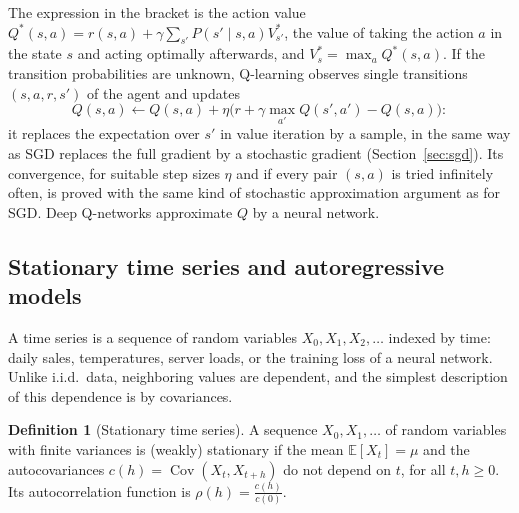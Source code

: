 \documentclass[11pt]{article}
\newcommand{\E}{\mathbb{E}}
\DeclareMathOperator{\Cov}{Cov}
\theoremstyle{definition}
\newtheorem{definition}{Definition}[section]
\theoremstyle{plain}
\theoremstyle{remark}
\begin{document}
The expression in the bracket is the action value $Q^*(s, a) = r(s, a) + \gamma\sum_{s'}P(s' \mid s, a)V^*_{s'}$, the value of taking the action $a$ in the state $s$ and acting optimally afterwards, and $V^*_s = \max_a Q^*(s, a)$. If the transition probabilities are unknown, Q-learning observes single transitions $(s, a, r, s')$ of the agent and updates
\[Q(s, a) \leftarrow Q(s, a) + \eta\big(r + \gamma\max_{a'}Q(s', a') - Q(s, a)\big):\]
it replaces the expectation over $s'$ in value iteration by a sample, in the same way as SGD replaces the full gradient by a stochastic gradient (Section~\ref{sec:sgd}). Its convergence, for suitable step sizes $\eta$ and if every pair $(s, a)$ is tried infinitely often, is proved with the same kind of stochastic approximation argument as for SGD. Deep Q-networks approximate $Q$ by a neural network.

\subsection{Stationary time series and autoregressive models}\label{sec:time-series}

A time series is a sequence of random variables $X_0, X_1, X_2, \ldots$ indexed by time: daily sales, temperatures, server loads, or the training loss of a neural network. Unlike i.i.d.\ data, neighboring values are dependent, and the simplest description of this dependence is by covariances.

\begin{definition}[Stationary time series]\label{def:stationary-series}
    A sequence $X_0, X_1, \ldots$ of random variables with finite variances is (weakly) stationary if the mean $\E[X_t] = \mu$ and the autocovariances $c(h) = \Cov(X_t, X_{t+h})$ do not depend on $t$, for all $t, h \geq 0$. Its autocorrelation function is $\rho(h) = \frac{c(h)}{c(0)}$.
\end{definition}
\end{document}
